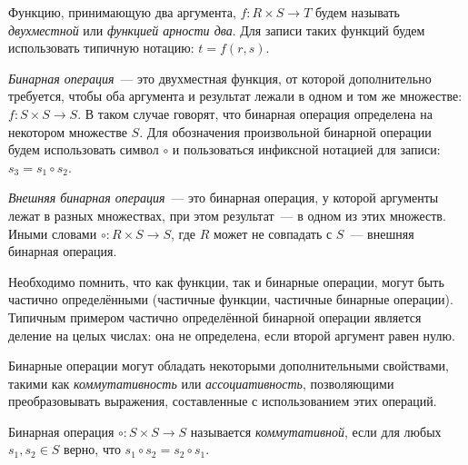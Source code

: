 \begin{definition}
    Функцию, принимающую два аргумента, $f: R \times S \to T$ будем называть \emph{двухместной} или \emph{функцией арности два}.
    Для записи таких функций будем использовать типичную нотацию: $t = f(r, s)$.
\end{definition}

\begin{definition}
    \emph{Бинарная операция}~--- это двухместная функция, от которой дополнительно требуется, чтобы оба аргумента и результат лежали в одном и том же множестве: $f: S \times S \to S$.
    В таком случае говорят, что бинарная операция определена на некотором множестве $S$. Для обозначения произвольной бинарной операции будем использовать символ $\circ$ и пользоваться инфиксной нотацией для записи: $s_3 = s_1 \circ s_2$.
\end{definition}

\begin{definition}
    \emph{Внешняя бинарная операция}~--- это бинарная операция, у которой аргументы лежат в разных множествах, при этом результат~--- в одном из этих множеств.
    Иными словами $\circ: R \times S \to S$, где $R$ может не совпадать с $S$~--- внешняя бинарная операция.
\end{definition}

Необходимо помнить, что как функции, так и бинарные операции, могут быть частично определёнными (частичные функции, частичные бинарные операции).
Типичным примером частично определённой бинарной операции является деление на целых числах: она не определена, если второй аргумент равен нулю.

Бинарные операции могут обладать некоторыми дополнительными свойствами, такими как \emph{коммутативность} или \emph{ассоциативность}, позволяющими преобразовывать выражения, составленные с использованием этих операций.

\begin{definition}
    Бинарная операция $\circ : S \times S \to S$ называется \emph{коммутативной}, если для любых  $s_1, s_2 \in S$ верно, что  $s_1 \circ s_2 = s_2 \circ s_1$.
\end{definition}

